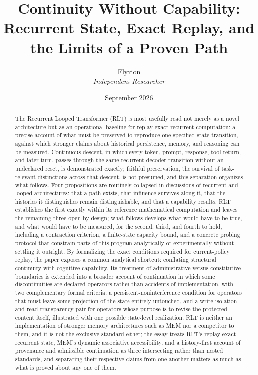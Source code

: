 \documentclass[11pt]{article}
\title{\textbf{Continuity Without Capability: \\ Recurrent State, Exact Replay, and the Limits of a Proven Path}}
\author{Flyxion \\ \textit{Independent Researcher}}
\date{September 2026}
\begin{document}
\maketitle

\begin{abstract}
The Recurrent Looped Transformer (RLT) is most usefully read not merely as a novel architecture but as an operational baseline for replay-exact recurrent computation: a precise account of what must be preserved to reproduce one specified state transition, against which stronger claims about historical persistence, memory, and reasoning can be measured. Continuous descent, in which every token, prompt, response, tool return, and later turn, passes through the same recurrent decoder transition without an undeclared reset, is demonstrated exactly; faithful preservation, the survival of task-relevant distinctions across that descent, is not presumed, and this separation organizes what follows. Four propositions are routinely collapsed in discussions of recurrent and looped architectures: that a path exists, that influence survives along it, that the histories it distinguishes remain distinguishable, and that a capability results. RLT establishes the first exactly within its reference mathematical computation and leaves the remaining three open by design; what follows develops what would have to be true, and what would have to be measured, for the second, third, and fourth to hold, including a contraction criterion, a finite-state capacity bound, and a concrete probing protocol that constrain parts of this program analytically or experimentally without settling it outright. By formalizing the exact conditions required for current-policy replay, the paper exposes a common analytical shortcut: conflating structural continuity with cognitive capability. Its treatment of administrative versus constitutive boundaries is extended into a broader account of continuation in which some discontinuities are declared operators rather than accidents of implementation, with two complementary formal criteria: a persistent-noninterference condition for operators that must leave some projection of the state entirely untouched, and a write-isolation and read-transparency pair for operators whose purpose is to revise the protected content itself, illustrated with one possible state-level realization. RLT is neither an implementation of stronger memory architectures such as MEM nor a competitor to them, and it is not the exclusive standard either; the essay treats RLT's replay-exact recurrent state, MEM's dynamic associative accessibility, and a history-first account of provenance and admissible continuation as three intersecting rather than nested standards, and separating their respective claims from one another matters as much as what is proved about any one of them.
\end{abstract}
\end{document}

